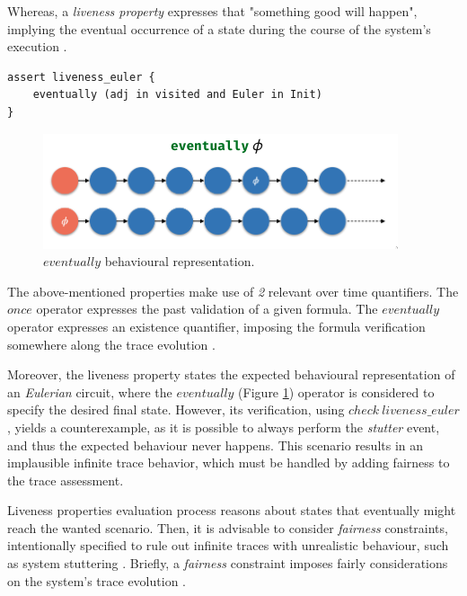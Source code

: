Whereas, a \textit{liveness property} expresses that "something good will happen", implying the eventual occurrence of a state during the course of the system's execution \cite{lamport1977proving}.

\begin{lstlisting}[title={\textit{Liveness Property}: Eventually the graph will represent an \textit{Eulerian} circuit.}, otherkeywords = {assert, eventually, in, and}]
assert liveness_euler {
    eventually (adj in visited and Euler in Init)
} 
\end{lstlisting}

\begin{figure}[H]
    \centering
    \includegraphics[width=0.6\linewidth]{images/alloy_eventually.png}
    \caption{$eventually$ behavioural representation.}
    \label{fig:alloy-eventually}
\end{figure}

The above-mentioned properties make use of \textit{2} relevant over time quantifiers. The $once$ operator expresses the past validation of a given formula. The $eventually$ operator expresses an existence quantifier, imposing the formula verification somewhere along the trace evolution \cite{alloy-docs}.

Moreover, the liveness property states the expected behavioural representation of an \textit{Eulerian} circuit, where the $eventually$ (Figure \ref{fig:alloy-eventually}) operator is considered to specify the desired final state. However, its verification, using $check\ liveness\_euler$, yields a counterexample, as it is possible to always perform the \textit{stutter} event, and thus the expected behaviour never happens. This scenario results in an implausible infinite trace behavior, which must be handled by adding fairness to the trace assessment. 

Liveness properties evaluation process reasons about states that eventually might reach the wanted scenario. Then, it is advisable to consider \textit{fairness} constraints, intentionally specified to rule out infinite traces with unrealistic behaviour, such as system stuttering \cite{baier2008principles}. Briefly, a \textit{fairness} constraint imposes fairly considerations on the system's trace evolution \cite{wahlfairness}.

